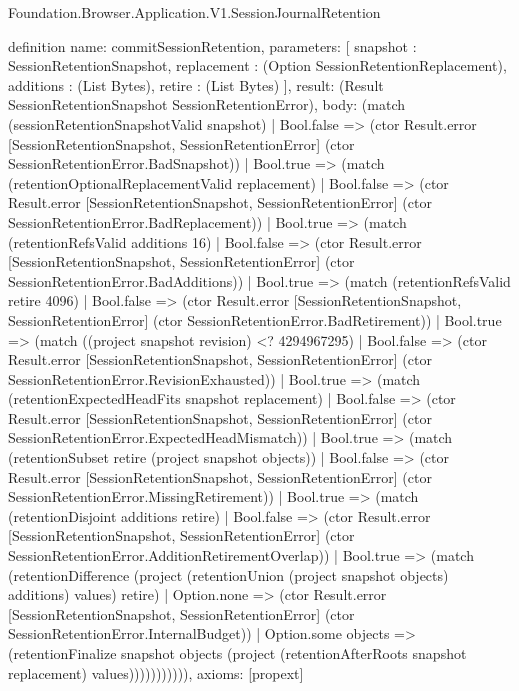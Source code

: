 \begin{lexlean}{Foundation.Browser.Application.V1.SessionJournalRetention}
\begin{semanticmodule}
definition{
  name: commitSessionRetention,
  parameters: [
    snapshot : SessionRetentionSnapshot,
    replacement : (Option SessionRetentionReplacement),
    additions : (List Bytes),
    retire : (List Bytes)
  ],
  result: (Result SessionRetentionSnapshot SessionRetentionError),
  body: (match (sessionRetentionSnapshotValid snapshot)
    | Bool.false => (ctor Result.error [SessionRetentionSnapshot, SessionRetentionError] (ctor SessionRetentionError.BadSnapshot))
    | Bool.true => (match (retentionOptionalReplacementValid replacement)
      | Bool.false => (ctor Result.error [SessionRetentionSnapshot, SessionRetentionError] (ctor SessionRetentionError.BadReplacement))
      | Bool.true => (match (retentionRefsValid additions 16)
        | Bool.false => (ctor Result.error [SessionRetentionSnapshot, SessionRetentionError] (ctor SessionRetentionError.BadAdditions))
        | Bool.true => (match (retentionRefsValid retire 4096)
          | Bool.false => (ctor Result.error [SessionRetentionSnapshot, SessionRetentionError] (ctor SessionRetentionError.BadRetirement))
          | Bool.true => (match ((project snapshot revision) <? 4294967295)
            | Bool.false => (ctor Result.error [SessionRetentionSnapshot, SessionRetentionError] (ctor SessionRetentionError.RevisionExhausted))
            | Bool.true => (match (retentionExpectedHeadFits snapshot replacement)
              | Bool.false => (ctor Result.error [SessionRetentionSnapshot, SessionRetentionError] (ctor SessionRetentionError.ExpectedHeadMismatch))
              | Bool.true => (match (retentionSubset retire (project snapshot objects))
                | Bool.false => (ctor Result.error [SessionRetentionSnapshot, SessionRetentionError] (ctor SessionRetentionError.MissingRetirement))
                | Bool.true => (match (retentionDisjoint additions retire)
                  | Bool.false => (ctor Result.error [SessionRetentionSnapshot, SessionRetentionError] (ctor SessionRetentionError.AdditionRetirementOverlap))
                  | Bool.true => (match (retentionDifference (project (retentionUnion (project snapshot objects) additions) values) retire)
                    | Option.none => (ctor Result.error [SessionRetentionSnapshot, SessionRetentionError] (ctor SessionRetentionError.InternalBudget))
                    | Option.some objects => (retentionFinalize snapshot objects (project (retentionAfterRoots snapshot replacement) values))))))))))),
  axioms: [propext]
}
\end{semanticmodule}
\end{lexlean}
